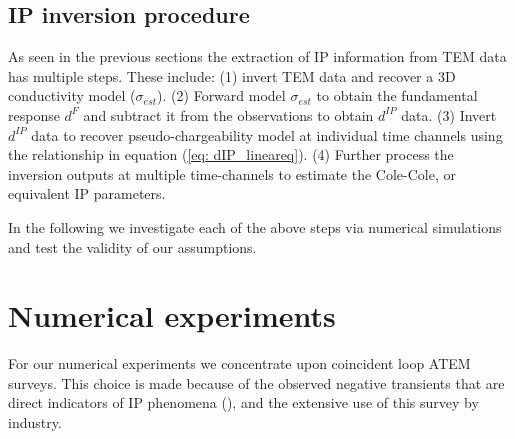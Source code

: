 \documentclass[extra,mreferee]{gji}
\newcommand{\dip}{d^{IP}}
\begin{document}

\subsection{IP inversion procedure}
As seen in the previous sections the extraction of IP information from TEM data has multiple steps. These include: (1) invert TEM data and recover a 3D conductivity model ($\sigma_{est}$). 
(2) Forward model $\sigma_{est}$ to obtain the fundamental response $d^F$ and subtract it from the observations to obtain $\dip$ data.
(3) Invert  $\dip$ data to recover pseudo-chargeability model at individual time channels using the relationship in equation (\ref{eq: dIP_lineareq}). 
(4) Further process the inversion outputs at multiple time-channels  to estimate the Cole-Cole, or equivalent IP parameters.

In the following we investigate each of the above steps via numerical simulations and test the validity of our assumptions. 


\section{Numerical experiments}
\label{section: numerical_examples}
For our numerical experiments we concentrate upon coincident loop ATEM surveys. This choice is made because of the observed negative transients that are direct indicators of IP phenomena (\cite{Kratzer2012,Kang2015a,Kang2015b,Doug2015}), and the extensive  use of this survey  by industry.  
\end{document}
